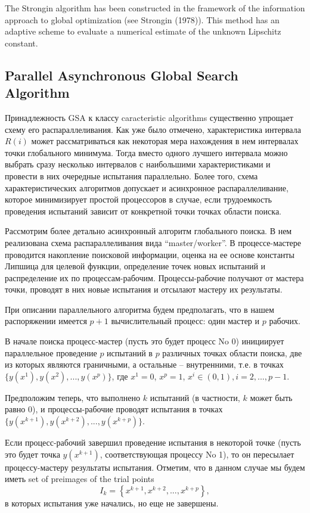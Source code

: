 \documentclass{svproc}
\begin{document}
The Strongin algorithm has been constructed in the framework of the information approach to global optimization (see Strongin (1978)). This method has an adaptive scheme to evaluate a numerical estimate of the unknown Lipschitz constant.



\subsection{Parallel Asynchronous Global Search Algorithm}

Принадлежность GSA к классу caracteristic algorithms существенно упрощает схему его распараллеливания. 
Как уже было отмечено, характеристика интервала $R(i)$ может рассматриваться как некоторая мера нахождения в нем интервалах точки глобального минимума. 
Тогда вместо одного лучшего интервала можно выбрать сразу несколько интервалов с наибольшими характеристиками и провести в них очередные испытания параллельно.
Более того, схема характеристических алгоритмов допускает и асинхронное распараллеливание, которое минимизирует простой процессоров в случае, если трудоемкость проведения испытаний зависит от конкретной точки точках области поиска. 

Рассмотрим более детально асинхронный алгоритм глобального поиска. В нем реализована схема распараллеливания вида ``master/worker''. В процессе-мастере проводится накопление поисковой информации, оценка на ее основе константы Липшица для целевой функции, определение точек новых испытаний и распределение их по процессам-рабочим. Процессы-рабочие получают от мастера точки, проводят в них новые испытания и отсылают мастеру их результаты. 

При описании параллельного алгоритма будем предполагать, что в нашем распоряжении имеется $p+1$ вычислительный процесс: один мастер и $p$ рабочих.
 
В начале поиска процесс-мастер (пусть это будет процесс No 0) инициирует параллельное проведение $p$ испытаний в $p$ различных точках области поиска, две из которых являются граничными, а остальные -- внутренними, т.е. в точках $\{y(x^1), y(x^2), ...,y(x^p)\}$, где $x^1 = 0$, $x^p = 1$, $x^i\in(0,1), i=2,..., p-1$.

Предположим теперь, что выполнено $k$ испытаний (в частности, $k$ может быть равно 0), и процессы-рабочие проводят испытания в точках $\{y(x^{k+1}), y(x^{k+2}), ...,y(x^{k+p})\}$. 

Если процесс-рабочий завершил проведение испытания в некоторой точке (пусть это будет точка $y(x^{k+1})$, соответствующая процессу No 1), то он пересылает процессу-мастеру результаты испытания. 
Отметим, что в данном случае мы будем иметь set of preimages of the trial points
\[
I_k = \left\{ x^{k+1},x^{k+2},...,x^{k+p} \right\},
\]
в которых испытания уже начались, но еще не завершены.
\end{document}
